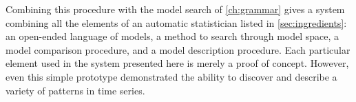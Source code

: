 Combining this procedure with the model search of \cref{ch:grammar} gives a system combining all the elements of an automatic statistician listed in \cref{sec:ingredients}:
an open-ended language of models, a method to search through model space, a model comparison procedure, and a model description procedure.
Each particular element used in the system presented here is merely a proof of concept.
However, even this simple prototype demonstrated the ability to discover and describe a variety of patterns in time series.







\outbpdocument{


}


